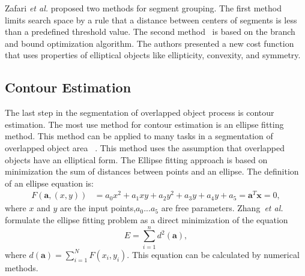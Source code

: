 \documentclass{lutmscthesis}[2010/09/22]
\begin{document}
\begin{figure}[htp]
\end{figure}

Zafari \emph{et al.} proposed two methods for segment grouping.  The first method~\cite{zafari-bb} limits search space by a rule that a distance between centers of segments is less than a predefined threshold value. The second method~\cite{zafari-bb} is based on the branch and bound optimization algorithm. The authors presented a new cost function that uses properties of elliptical objects like ellipticity, convexity, and symmetry. 



\subsection{Contour Estimation}

The last step in the segmentation of overlapped object process is contour estimation. The most use method for contour estimation is an ellipse fitting method. This method can be applied to many tasks in a segmentation of overlapped object area ~\cite{BE-FRS,Zhao2017,zafari-bb,LANGLARD2018}. This method uses the assumption that overlapped objects have an elliptical form. The Ellipse fitting approach is based on minimization the sum of distances between points and an ellipse. The definition of an ellipse equation is:
\begin{align}
    F(\textbf{a},(x,y)) &= a_0x^2 + a_1xy + a_2y^2 + a_3y + a_4y + a_5 = \textbf{a}^T \mathbf{x} = 0,
\end{align}
where $x$ and $y$ are the input points,$a_0...a_5$ are free parameters. Zhang~\emph{et al.}~\cite{acos_1} formulate the ellipse fitting problem as a  direct minimization of the equation 
\begin{equation}
    E = \sum_{i=1}^{n}d^2(\textbf{a}),
\end{equation}
where $d(\textbf{a}) = \sum_{i=1}^N{F(x_i, y_i)}$. This equation can be calculated by numerical methods.
\end{document}
